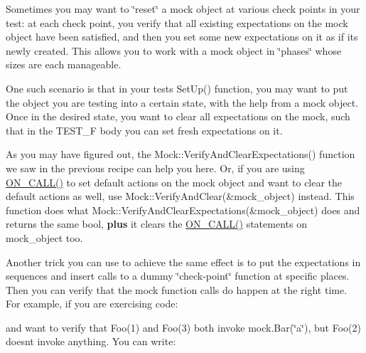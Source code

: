 Sometimes you may want to \char`\"{}reset\char`\"{} a mock object at various check points in your test\+: at each check point, you verify that all existing expectations on the mock object have been satisfied, and then you set some new expectations on it as if it\textquotesingle{}s newly created. This allows you to work with a mock object in \char`\"{}phases\char`\"{} whose sizes are each manageable.

One such scenario is that in your test\textquotesingle{}s {\ttfamily Set\+Up()} function, you may want to put the object you are testing into a certain state, with the help from a mock object. Once in the desired state, you want to clear all expectations on the mock, such that in the {\ttfamily T\+E\+S\+T\+\_\+F} body you can set fresh expectations on it.

As you may have figured out, the {\ttfamily Mock\+::\+Verify\+And\+Clear\+Expectations()} function we saw in the previous recipe can help you here. Or, if you are using {\ttfamily \mbox{\hyperlink{gmock-spec-builders_8h_a5b12ae6cf84f0a544ca811b380c37334}{O\+N\+\_\+\+C\+A\+L\+L()}}} to set default actions on the mock object and want to clear the default actions as well, use {\ttfamily Mock\+::\+Verify\+And\+Clear(\&mock\+\_\+object)} instead. This function does what {\ttfamily Mock\+::\+Verify\+And\+Clear\+Expectations(\&mock\+\_\+object)} does and returns the same {\ttfamily bool}, {\bfseries{plus}} it clears the {\ttfamily \mbox{\hyperlink{gmock-spec-builders_8h_a5b12ae6cf84f0a544ca811b380c37334}{O\+N\+\_\+\+C\+A\+L\+L()}}} statements on {\ttfamily mock\+\_\+object} too.

Another trick you can use to achieve the same effect is to put the expectations in sequences and insert calls to a dummy \char`\"{}check-\/point\char`\"{} function at specific places. Then you can verify that the mock function calls do happen at the right time. For example, if you are exercising code\+:


\begin{DoxyCode}{0}
\end{DoxyCode}


and want to verify that {\ttfamily Foo(1)} and {\ttfamily Foo(3)} both invoke {\ttfamily mock.\+Bar(\char`\"{}a\char`\"{})}, but {\ttfamily Foo(2)} doesn\textquotesingle{}t invoke anything. You can write\+:



